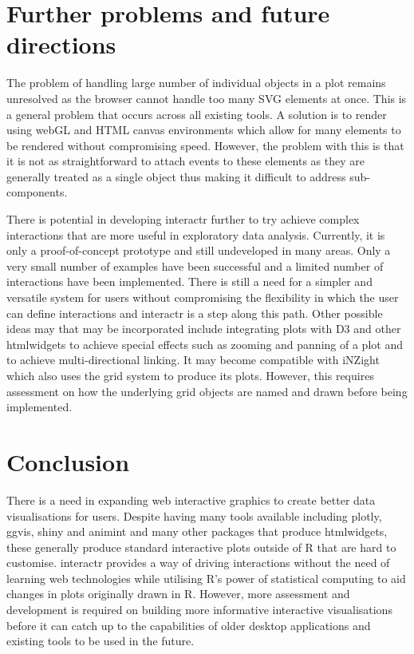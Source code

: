 \documentclass[11pt,]{report}
\begin{document}
\section{Further problems and future
directions}\label{further-problems-and-future-directions}

The problem of handling large number of individual objects in a plot
remains unresolved as the browser cannot handle too many SVG elements at
once. This is a general problem that occurs across all existing tools. A
solution is to render using webGL and HTML canvas environments which
allow for many elements to be rendered without compromising speed.
However, the problem with this is that it is not as straightforward to
attach events to these elements as they are generally treated as a
single object thus making it difficult to address sub-components.

There is potential in developing \textsf{interactr} further to try
achieve complex interactions that are more useful in exploratory data
analysis. Currently, it is only a proof-of-concept prototype and still
undeveloped in many areas. Only a very small number of examples have
been successful and a limited number of interactions have been
implemented. There is still a need for a simpler and versatile system
for users without compromising the flexibility in which the user can
define interactions and \textsf{interactr} is a step along this path.
Other possible ideas may that may be incorporated include integrating
plots with \textsf{D3} and other htmlwidgets to achieve special effects
such as zooming and panning of a plot and to achieve multi-directional
linking. It may become compatible with \textsf{iNZight} which also uses
the grid system to produce its plots. However, this requires assessment
on how the underlying grid objects are named and drawn before being
implemented.

\section{Conclusion}\label{conclusion}

There is a need in expanding web interactive graphics to create better
data visualisations for users. Despite having many tools available
including plotly, ggvis, shiny and animint and many other packages that
produce htmlwidgets, these generally produce standard interactive plots
outside of R that are hard to customise. interactr provides a way of
driving interactions without the need of learning web technologies while
utilising R's power of statistical computing to aid changes in plots
originally drawn in R. However, more assessment and development is
required on building more informative interactive visualisations before
it can catch up to the capabilities of older desktop applications and
existing tools to be used in the future.
\end{document}
